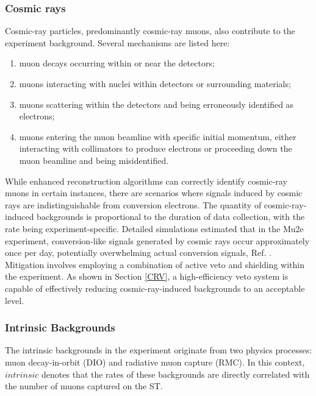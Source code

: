 \subsubsection{Cosmic rays}
Cosmic-ray particles, predominantly cosmic-ray muons, also contribute to the experiment background. Several mechanisms are listed here:
\begin{enumerate}
    \item muon decays occurring within or near the detectors;
    \item muons interacting with nuclei within detectors or surrounding materials;
    \item muons scattering within the detectors and being erroneously identified as electrons;
    \item muons entering the muon beamline with specific initial momentum, either interacting with collimators to produce electrons or proceeding down the muon beamline and being misidentified.
\end{enumerate}

While enhanced reconstruction algorithms can correctly identify cosmic-ray muons in certain instances, there are scenarios where signals induced by cosmic rays are indistinguishable from conversion electrons. The quantity of cosmic-ray-induced backgrounds is proportional to the duration of data collection, with the rate being experiment-specific. Detailed simulations estimated that in the Mu2e experiment, conversion-like signals generated by cosmic rays occur approximately once per day, potentially overwhelming actual conversion signals, Ref. \cite{CRVposter}. Mitigation involves employing a combination of active veto and shielding within the experiment. As shown in Section \ref{CRV}, a high-efficiency veto system is capable of effectively reducing cosmic-ray-induced backgrounds to an acceptable level.
\subsubsection{Intrinsic Backgrounds}
The intrinsic backgrounds in the experiment originate from two physics processes: muon decay-in-orbit (DIO) and radiative muon capture (RMC). In this context, $intrinsic$ denotes that the rates of these backgrounds are directly correlated with the number of muons captured on the ST.
